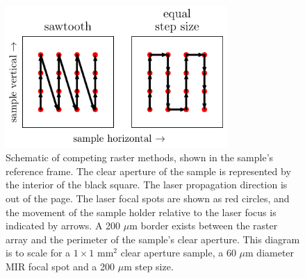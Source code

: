 \begin{figure}
	\centering
	\includegraphics[width=0.75\textwidth]{figures/chap4/rastering_methods.pdf}
	\caption{Schematic of competing raster methods, shown in the sample's reference frame. The clear aperture of the sample is represented by the interior of the black square. The laser propagation direction is out of the page. The laser focal spots are shown as red circles, and the movement of the sample holder relative to the laser focus is indicated by arrows. A 200 $\mu$m border exists between the raster array and the perimeter of the sample's clear aperture. This diagram is to scale for a $1\times1$ mm$^2$ clear aperture sample, a 60 $\mu$m diameter MIR focal spot and a 200 $\mu$m step size.}
	\label{fig:Rastering_Methods}
\end{figure}


